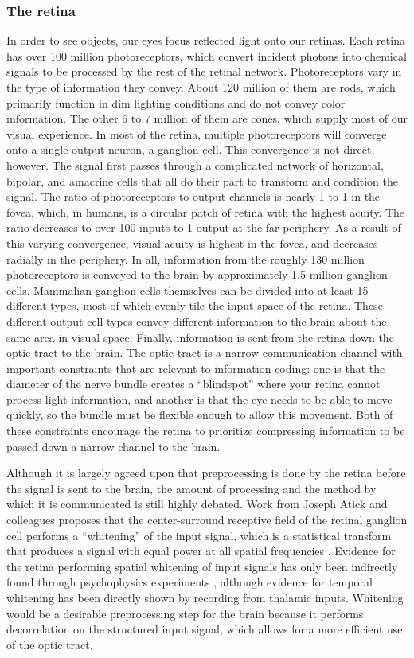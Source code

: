 \subsubsection{The retina}
In order to see objects, our eyes focus reflected light onto our retinas.
Each retina has over 100 million photoreceptors, which convert incident photons into chemical signals to be processed by the rest of the retinal network.
Photoreceptors vary in the type of information they convey.
About 120 million of them are rods, which primarily function in dim lighting conditions and do not convey color information.
The other 6 to 7 million of them are cones, which supply most of our visual experience.
In most of the retina, multiple photoreceptors will converge onto a single output neuron, a ganglion cell.
This convergence is not direct, however.
The signal first passes through a complicated network of horizontal, bipolar, and amacrine cells that all do their part to transform and condition the signal.
The ratio of photoreceptors to output channels is nearly 1 to 1 in the fovea, which, in humans, is a circular patch of retina with the highest acuity.
The ratio decreases to over 100 inputs to 1 output at the far periphery.
As a result of this varying convergence, visual acuity is highest in the fovea, and decreases radially in the periphery.
In all, information from the roughly 130 million photoreceptors is conveyed to the brain by approximately 1.5 million ganglion cells.
Mammalian ganglion cells themselves can be divided into at least 15 different types, most of which evenly tile the input space of the retina.
These different output cell types convey different information to the brain about the same area in visual space. Finally, information is sent from the retina down the optic tract to the brain. The optic tract is a narrow communication channel with important constraints that are relevant to information coding: one is that the diameter of the nerve bundle creates a ``blindspot'' where your retina cannot process light information, and another is that the eye needs to be able to move quickly, so the bundle must be flexible enough to allow this movement. Both of these constraints encourage the retina to prioritize compressing information to be passed down a narrow channel to the brain.

Although it is largely agreed upon that preprocessing is done by the retina before the signal is sent to the brain, the amount of processing and the method by which it is communicated is still highly debated.
Work from Joseph Atick and colleagues proposes that the center-surround receptive field of the retinal ganglion cell performs a ``whitening'' of the input signal, which is a statistical transform that produces a signal with equal power at all spatial frequencies \parencite{atick1990towards, atick1992what}.
Evidence for the retina performing spatial whitening of input signals has only been indirectly found through psychophysics experiments \parencite{atick1992what}, although evidence for temporal whitening has been directly shown \parencite{dong1995statistics} by recording from thalamic inputs.
Whitening would be a desirable preprocessing step for the brain because it performs decorrelation on the structured input signal, which allows for a more efficient use of the optic tract.

